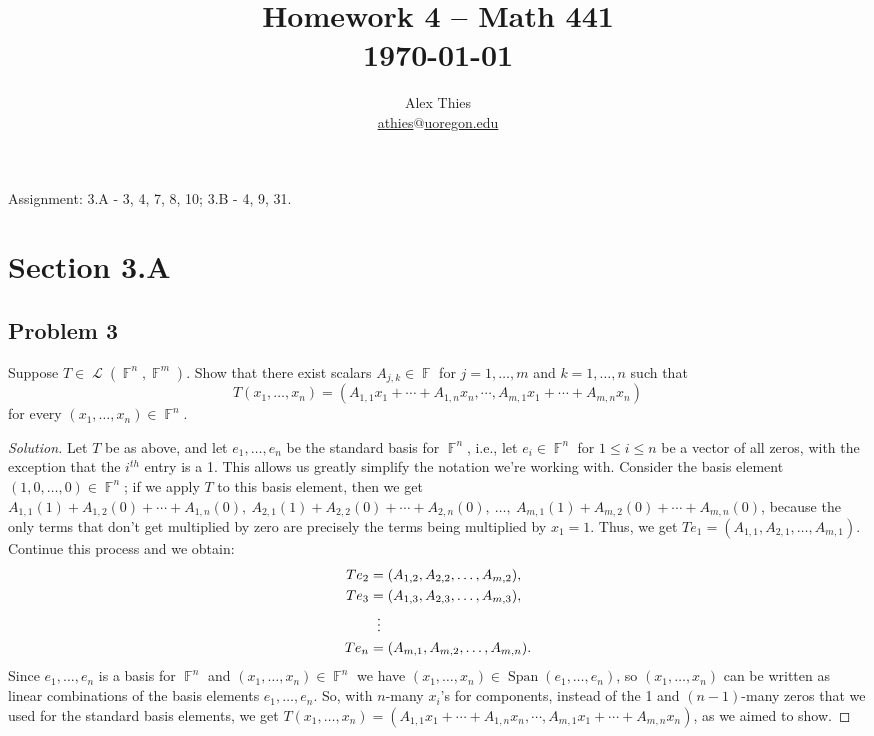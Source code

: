 \documentclass[letterpaper, 12pt]{amsart}
\DeclareMathOperator{\F}{\mathbb{F}}
\DeclareMathOperator{\Ell}{\mathscr{L}}
\theoremstyle{definition}  %
\DeclareMathOperator{\Span}{Span}
\begin{document}
	\title{Homework 4  -- Math 441 \\ \today}
	\author{Alex Thies \\ \href{mailto:athies@uoregon.edu}{\lowercase{athies$@$uoregon.edu}}}

	\maketitle

	Assignment: 3.A - 3, 4, 7, 8, 10; 3.B - 4, 9, 31.

	\section*{Section 3.A}
		\subsection*{Problem 3}
		Suppose $T \in \Ell (\F^{n}, \F^{m})$.
		Show that there exist scalars $A_{j,k} \in \F$ for $j = 1, \dots, m$ and $k = 1, \dots, n$ such that $$T(x_{1}, \dots, x_{n}) = (A_{1,1} x_{1} + \cdots + A_{1,n}x_{n}, \cdots, A_{m,1}x_{1} + \cdots + A_{m,n}x_{n})$$ for every $(x_{1}, \dots, x_{n}) \in \F^{n}$.

		\begin{proof}[Solution]
		Let $T$ be as above, and let $e_{1}, \dots, e_{n}$ be the standard basis for $\F^{n}$, i.e., let $e_{i} \in \F^{n}$ for $1 \leq i \leq n$ be a vector of all zeros, with the exception that the $i^{th}$ entry is a 1.
		This allows us greatly simplify the notation we're working with.
		Consider the basis element $(1,0, \dots, 0) \in \F^{n}$; if we apply $T$ to this basis element, then  we get $A_{1,1} (1) + A_{1,2} (0) + \cdots + A_{1,n}(0), \ A_{2,1} (1) + A_{2,2} (0) + \cdots + A_{2,n}(0), \ \dots, \ A_{m,1} (1) + A_{m,2} (0) + \cdots + A_{m,n}(0)$, because the only terms that don't get multiplied by zero are precisely the terms being multiplied by $x_{1} = 1$.
		Thus, we get $Te_{1} = (A_{1,1}, A_{2,1}, \dots, A_{m,1})$.
		Continue this process and we obtain:
			\begin{align*}
				Te_{2} &= (A_{1,2}, A_{2,2}, \dots, A_{m,2}), \\
				Te_{3} &= (A_{1,3}, A_{2,3}, \dots, A_{m,3}), \\
				& \hspace{2mm} \vdots \\
				Te_{n} &= (A_{m,1}, A_{m,2}, \dots, A_{m,n}).
			\end{align*}
		Since $e_{1}, \dots, e_{n}$ is a basis for $\F^{n}$ and $(x_{1}, \dots, x_{n}) \in \F^{n}$ we have $(x_{1}, \dots, x_{n}) \in \Span(e_{1}, \dots, e_{n})$, so $(x_{1}, \dots, x_{n})$ can be written as linear combinations of the basis elements $e_{1}, \dots, e_{n}$.
		So, with $n$-many $x_{i}$'s for components, instead of the 1 and $(n-1)$-many zeros that we used for the standard basis elements, we get $T(x_{1}, \dots, x_{n}) = (A_{1,1} x_{1} + \cdots + A_{1,n}x_{n}, \cdots, A_{m,1}x_{1} + \cdots + A_{m,n}x_{n})$, as we aimed to show.
		\end{proof}
\end{document}

